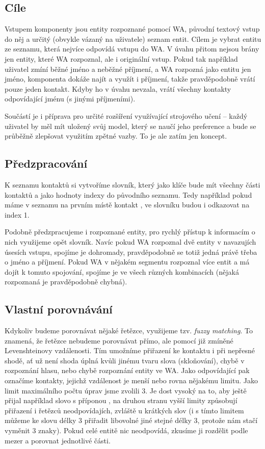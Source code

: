 \subsection{Cíle}

Vstupem komponenty jsou entity rozpoznané pomocí WA, původní textový vstup do něj
a určitý (obvykle vázaný na uživatele) seznam entit. Cílem je vybrat entitu ze seznamu,
která nejvíce odpovídá vstupu do WA. V úvahu přitom nejsou brány jen entity, které
WA rozpoznal, ale i originální vstup. Pokud tak například uživatel zmíní běžné jméno a
neběžné příjmení, a WA rozpozná jako entitu jen jméno, komponenta dokáže najít a využít
i příjmení, takže pravděpodobně vrátí pouze jeden kontakt. Kdyby ho v úvahu nevzala,
vrátí všechny kontakty odpovídající jménu (s jinými příjmeními).

Součástí je i příprava pro určité rozšíření využívající strojového učení -- každý
uživatel by měl mít uložený svůj model, který se naučí jeho preference a bude se
průběžně zlepšovat využitím zpětné vazby. To je ale zatím jen koncept.

\subsection{Předzpracování}

K seznamu kontaktů si vytvoříme slovník,
který jako klíče bude mít všechny části kontaktů a jako hodnoty indexy do původního
seznamu. Tedy například pokud máme v seznamu na prvním místě kontakt ,
ve slovníku budou  i  odkazovat na index 1.

Podobně předzpracujeme i rozpoznané entity, pro rychlý přístup k informacím o nich
využijeme opět slovník. Navíc pokud WA rozpoznal dvě entity v navazujích úsesích vstupu,
spojíme je dohromady, pravděpodobně se totiž jedná právě třeba o jméno a příjmení.
Pokud WA v nějakém segmentu rozpoznal více entit a má dojít k tomuto spojování, spojíme
je ve všech různých kombinacích (nějaká rozpoznaná je pravděpodobně chybná).

\subsection{Vlastní porovnávání}

Kdykoliv budeme porovnávat nějaké řetězce, využijeme tzv. \textit{fuzzy matching}.
To znamená, že řetězce nebudeme porovnávat přímo, ale pomocí již zmíněné
Levenshteinovy vzdálenosti. Tím umožníme přiřazení ke kontaktu i při nepřesné shodě,
ať už není shoda úplná kvůli jinému tvaru slova (skloňování), chybě v rozpoznání
hlasu, nebo chybě rozpoznání entity ve WA. Jako odpovídající pak označíme kontakty,
jejichž vzdálenost je menší nebo rovna nějakému limitu. Jako limit maximálního počtu
úprav jsme zvolili 3. Je dost vysoký na to, aby ještě přijal například slovo s příponou
, na druhou stranu vyšší limity způsobují přiřazení i řetězců neodpovídajích,
zvláště u krátkých slov (i s tímto limitem můžeme ke slovu délky 3 přiřadit libovolné jiné
stejné délky 3, protože nám stačí vyměnit 3 znaky). Pokud celé entitě nic neodpovídá,
zkusíme ji rozdělit podle mezer a porovnat jednotlivé části.


